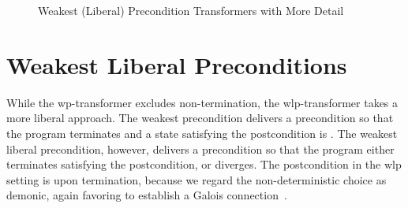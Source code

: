 \begin{figure}[ht]\centering
  \hfill
  \hfill{}
  \hfill{}
  \caption{Weakest (Liberal) Precondition Transformers with More Detail}
  \label{fig:wp-wlp-extended}
\end{figure}
  















\section{Weakest Liberal Preconditions}\label{sec:wlp}
While the wp-transformer excludes non-termination, the wlp-transformer takes a more liberal approach. 
The weakest precondition delivers a precondition so that the program terminates and a state satisfying the postcondition is . 
The weakest liberal precondition, however, delivers a precondition so that the program either terminates satisfying the postcondition, or diverges. 
The postcondition in the wlp setting is  upon termination, because we regard the non-deterministic choice as demonic, again favoring to establish a Galois connection~\cite{zhang22}. 

